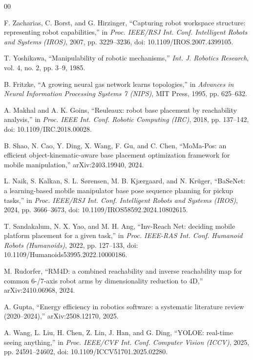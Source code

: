 \documentclass[conference]{IEEEtran}
\begin{document}
\begin{thebibliography}{00}

F. Zacharias, C. Borst, and G. Hirzinger, ``Capturing robot workspace structure: representing robot capabilities,'' in \textit{Proc. IEEE/RSJ Int. Conf. Intelligent Robots and Systems (IROS)}, 2007, pp. 3229--3236, doi: 10.1109/IROS.2007.4399105.

T. Yoshikawa, ``Manipulability of robotic mechanisms,'' \textit{Int. J. Robotics Research}, vol. 4, no. 2, pp. 3--9, 1985.

B. Fritzke, ``A growing neural gas network learns topologies,'' in \textit{Advances in Neural Information Processing Systems 7 (NIPS)}, MIT Press, 1995, pp. 625--632.

A. Makhal and A. K. Goins, ``Reuleaux: robot base placement by reachability analysis,'' in \textit{Proc. IEEE Int. Conf. Robotic Computing (IRC)}, 2018, pp. 137--142, doi: 10.1109/IRC.2018.00028.

B. Shao, N. Cao, Y. Ding, X. Wang, F. Gu, and C. Chen, ``MoMa-Pos: an efficient object-kinematic-aware base placement optimization framework for mobile manipulation,'' arXiv:2403.19940, 2024.

L. Naik, S. Kalkan, S. L. S{\o}rensen, M. B. Kj{\ae}rgaard, and N. Kr{\"u}ger, ``BaSeNet: a learning-based mobile manipulator base pose sequence planning for pickup tasks,'' in \textit{Proc. IEEE/RSJ Int. Conf. Intelligent Robots and Systems (IROS)}, 2024, pp. 3666--3673, doi: 10.1109/IROS58592.2024.10802615.

T. Sandakalum, N. X. Yao, and M. H. Ang, ``Inv-Reach Net: deciding mobile platform placement for a given task,'' in \textit{Proc. IEEE-RAS Int. Conf. Humanoid Robots (Humanoids)}, 2022, pp. 127--133, doi: 10.1109/Humanoids53995.2022.10000186.

M. Rudorfer, ``RM4D: a combined reachability and inverse reachability map for common 6-/7-axis robot arms by dimensionality reduction to 4D,'' arXiv:2410.06968, 2024.

A. Gupta, ``Energy efficiency in robotics software: a systematic literature review (2020--2024),'' arXiv:2508.12170, 2025.

A. Wang, L. Liu, H. Chen, Z. Lin, J. Han, and G. Ding, ``YOLOE: real-time seeing anything,'' in \textit{Proc. IEEE/CVF Int. Conf. Computer Vision (ICCV)}, 2025, pp. 24591--24602, doi: 10.1109/ICCV51701.2025.02280.


\end{thebibliography}
\end{document}
